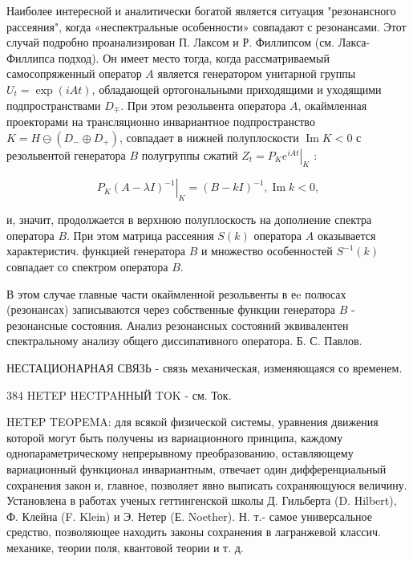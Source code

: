 \documentclass[10pt]{article}
\begin{document}
Наиболее интересной и аналитически богатой является ситуация "резонансного рассеяния", когда «неспектральные особенности» совпадают с резонансами. Этот случай подробно проанализирован П. Лаксом и Р. Филлипсом (см. Лакса-Филлипса подход). Он имеет место тогда, когда рассматриваемый самосопряженный оператор $A$ является генератором унитарной группы $U_{t}=\exp (i A t)$, обладающей ортогональными приходящими и уходящими подпространствами $D_{\mp}$. При этом резольвента оператора $A$, окаймленная проекторами на трансляционно инвариантное подпространство $K=H \ominus\left(D_{-} \oplus D_{+}\right)$, совпадает в нижней полуплоскости $\operatorname{Im} K<0$ с резольвентой генератора $B$ полугруппы сжатий $Z_{t}=\left.P_{K} e^{i A t}\right|_{K}$ :



\[

\left.P_{K}(A-\lambda I)^{-1}\right|_{K}=(B-k I)^{-1}, \operatorname{Im} k<0,

\]



и, значит, продолжается в верхнюю полуплоскость на дополнение спектра оператора $B$. При этом матрица рассеяния $S(k)$ оператора $A$ оказывается характеристич. функцией генератора $B$ и множество особенностей $S^{-1}(k)$ совпадает со спектром оператора $B$.



В этом случае главные части окаймленной резольвенты в еe полюсах (резонансах) записываются через собственные функции генератора $B$ - резонансные состояния. Анализ резонансных состояний эквивалентен спектральному анализу общего диссипативного оператора. Б. С. Павлов.



НЕСТАЦИОНАРНАЯ СВЯЗЬ - связь механическая, изменяющаяся со временем.



384 HETEP HECTPAННЫЙ TOK - см. Ток.



HETEP TEOPEMA: для всякой физической системы, уравнения движения которой могут быть получены из вариационного принципа, каждому однопараметрическому непрерывному преобразованию, оставляющему вариационный функционал инвариантным, отвечает один дифференциальный сохранения закон и, главное, позволяет явно выписать сохраняющуюся величину. Установлена в работах ученых геттингенской школы Д. Гильберта (D. Hilbert), Ф. Клейна (F. Klein) и Э. Нетер (Е. Noether). Н. т.- самое универсальное средство, позволяющее находить законы сохранения в лагранжевой классич. механике, теории поля, квантовой теории и т. д.
\end{document}
